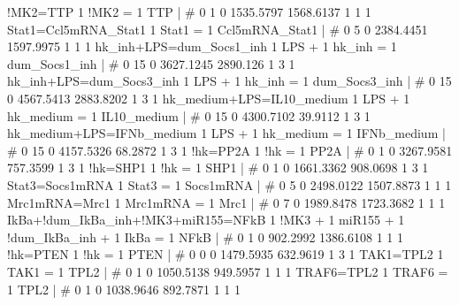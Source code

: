 !MK2=TTP                                            	1 !MK2 = 1 TTP 	| 	# 	0              1              0      1535.5797      1568.6137              1              1              1 
Stat1=Ccl5mRNA_Stat1                                	1 Stat1 = 1 Ccl5mRNA_Stat1 	| 	# 	0              5              0      2384.4451      1597.9975              1              1              1 
hk_inh+LPS=dum_Socs1_inh                            	1 LPS + 1 hk_inh = 1 dum_Socs1_inh 	| 	# 	0             15              0      3627.1245       2890.126              1              3              1 
hk_inh+LPS=dum_Socs3_inh                            	1 LPS + 1 hk_inh = 1 dum_Socs3_inh 	| 	# 	0             15              0      4567.5413      2883.8202              1              3              1 
hk_medium+LPS=IL10_medium                           	1 LPS + 1 hk_medium = 1 IL10_medium 	| 	# 	0             15              0      4300.7102        39.9112              1              3              1 
hk_medium+LPS=IFNb_medium                           	1 LPS + 1 hk_medium = 1 IFNb_medium 	| 	# 	0             15              0      4157.5326        68.2872              1              3              1 
!hk=PP2A                                            	1 !hk = 1 PP2A 	| 	# 	0              1              0      3267.9581       757.3599              1              3              1 
!hk=SHP1                                            	1 !hk = 1 SHP1 	| 	# 	0              1              0      1661.3362       908.0698              1              3              1 
Stat3=Socs1mRNA                                     	1 Stat3 = 1 Socs1mRNA 	| 	# 	0              5              0      2498.0122      1507.8873              1              1              1 
Mrc1mRNA=Mrc1                                       	1 Mrc1mRNA = 1 Mrc1 	| 	# 	0              7              0      1989.8478      1723.3682              1              1              1 
IkBa+!dum_IkBa_inh+!MK3+miR155=NFkB                 	1 !MK3 + 1 miR155 + 1 !dum_IkBa_inh + 1 IkBa = 1 NFkB 	| 	# 	0              1              0       902.2992      1386.6108              1              1              1 
!hk=PTEN                                            	1 !hk = 1 PTEN 	| 	# 	0              0              0      1479.5935       632.9619              1              3              1 
TAK1=TPL2                                           	1 TAK1 = 1 TPL2 	| 	# 	0              1              0      1050.5138       949.5957              1              1              1 
TRAF6=TPL2                                          	1 TRAF6 = 1 TPL2 	| 	# 	0              1              0      1038.9646       892.7871              1              1              1 

